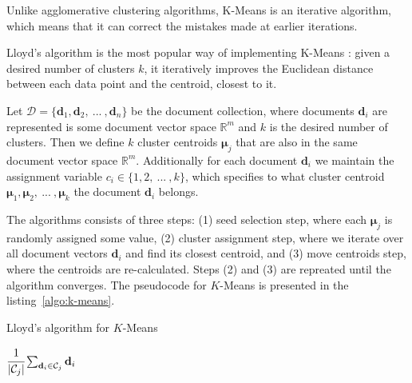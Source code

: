 Unlike agglomerative clustering algorithms, K-Means is an iterative 
algorithm, which means that it can correct the mistakes made 
at earlier iterations. 

Lloyd's algorithm  is the most popular way of implementing K-Means 
\cite{xu2005survey}: given a desired number of clusters $k$, 
it iteratively improves the Euclidean distance between each data 
point and the centroid, closest to it. 


Let $\mathcal D = \{  \mathbf d_1, \mathbf d_2, \ ... \ , \mathbf d_n \}$ 
be the document collection, where documents $\mathbf d_i$ are represented 
is some document vector space $\mathbb R^m$ and $k$ is the desired 
number of clusters. Then we define $k$ cluster centroids $\boldsymbol \mu_j$ that are 
also in the same document vector space $\mathbb R^m$. 
Additionally for each document $\mathbf d_i$ we maintain the assignment 
variable $c_i \in \{ 1, 2, \ ... \ , k \}$, which specifies to what
cluster centroid $\boldsymbol \mu_1, \boldsymbol \mu_2, \ ... \ , \boldsymbol \mu_k$ 
the document $\mathbf d_i$ belongs. 


The algorithms consists of three steps: (1) seed selection step, 
where each $\boldsymbol \mu_j$ is randomly assigned some value, 
(2) cluster assignment step, where we iterate over all document vectors
$\mathbf d_i$ and find its closest centroid, and (3)  move centroids step,
where the centroids are re-calculated. Steps (2) and (3) are repreated 
until the algorithm converges. The pseudocode for $K$-Means is presented 
in the listing~\ref{algo:k-means}.


\begin{algorithm}
\caption{Lloyd's algorithm for $K$-Means}
\label{algo:k-means}

\begin{algorithmic}[0]
  \Statex
     
    \EndFor

       
      \EndFor

       
            {$\cfrac{1}{| \mathcal C_j |} \sum_{\mathbf d_i \in \mathcal C_j} \mathbf d_i$}
      \EndFor
    \EndWhile

    \State {}
  \EndFunction
\end{algorithmic}
\end{algorithm}

